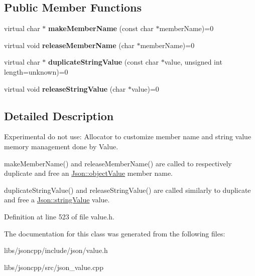 \subsection*{Public Member Functions}
\begin{DoxyCompactItemize}
\item 
\hypertarget{class_json_1_1_value_allocator_af2370043912c62bb2f3d3277b2c0a125}{virtual char $\ast$ {\bfseries make\-Member\-Name} (const char $\ast$member\-Name)=0}\label{class_json_1_1_value_allocator_af2370043912c62bb2f3d3277b2c0a125}

\item 
\hypertarget{class_json_1_1_value_allocator_ae8206cbaf1004994696a1ffec0d7e29a}{virtual void {\bfseries release\-Member\-Name} (char $\ast$member\-Name)=0}\label{class_json_1_1_value_allocator_ae8206cbaf1004994696a1ffec0d7e29a}

\item 
\hypertarget{class_json_1_1_value_allocator_aaa63197291f55d060541a01fcf5a5dfc}{virtual char $\ast$ {\bfseries duplicate\-String\-Value} (const char $\ast$value, unsigned int length=unknown)=0}\label{class_json_1_1_value_allocator_aaa63197291f55d060541a01fcf5a5dfc}

\item 
\hypertarget{class_json_1_1_value_allocator_aa75c50f08bab7db386673ab355668c99}{virtual void {\bfseries release\-String\-Value} (char $\ast$value)=0}\label{class_json_1_1_value_allocator_aa75c50f08bab7db386673ab355668c99}

\end{DoxyCompactItemize}


\subsection{Detailed Description}
Experimental do not use\-: Allocator to customize member name and string value memory management done by Value. 


\begin{DoxyItemize}
\item make\-Member\-Name() and release\-Member\-Name() are called to respectively duplicate and free an \hyperlink{namespace_json_a7d654b75c16a57007925868e38212b4eae8386dcfc36d1ae897745f7b4f77a1f6}{Json\-::object\-Value} member name.
\item duplicate\-String\-Value() and release\-String\-Value() are called similarly to duplicate and free a \hyperlink{namespace_json_a7d654b75c16a57007925868e38212b4ea804ef857affea2d415843c73f261c258}{Json\-::string\-Value} value. 
\end{DoxyItemize}

Definition at line 523 of file value.\-h.



The documentation for this class was generated from the following files\-:\begin{DoxyCompactItemize}
\item 
libs/jsoncpp/include/json/value.\-h\item 
libs/jsoncpp/src/json\-\_\-value.\-cpp\end{DoxyCompactItemize}
